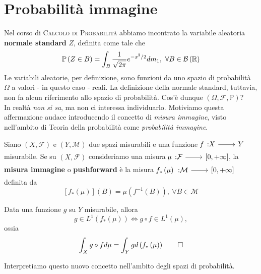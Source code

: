 \section{Probabilità immagine}\label{probimm}
Nel corso di \textsc{Calcolo di Probabilità} abbiamo incontrato la variabile aleatoria \textbf{normale standard} $Z$, definita come tale che
\begin{equation}
	\mathbb{P}\left(Z\in B\right)=\int_{B}\frac{1}{\sqrt{2\pi}}e^{-x^2/2}dm_1,\ \forall B\in\mathcal{B}\left(\mathbb{R}\right)
\end{equation}
Le variabili aleatorie, per definizione, sono funzioni da uno spazio di probabilità $\Omega$ a valori - in questo caso - reali. La definizione della normale standard, tuttavia, non fa alcun riferimento allo spazio di probabilità. Cos'è dunque  $\left(\Omega,\mathcal{F},\mathbb{P}\right)$?\\
In realtà \textit{non si sa}, ma non ci interessa individuarlo. Motiviamo questa affermazione audace introducendo il concetto di \textit{misura immagine}, visto nell'ambito di Teoria della probabilità come \textit{probabilità immagine}.
\begin{define}
	Siano $\left(X,\mathcal{F}\right)$ e $\left(Y,\mathcal{M}\right)$ due spazi misurabili e una funzione $\funz{f}{X}{Y}$ misurabile. Se su $\left(X,\mathcal{F}\right)$ consideriamo una misura $\funz{\mu}{\mathcal{F}}{\left[0,+\infty\right]}$, la \textbf{misura immagine} o \textbf{pushforward} è la misura $\funz{f_{\ast}\left(\mu\right)}{\mathcal{M}}{\left[0,+\infty\right]}$ definita da
	\begin{equation}
		\left[f_{\ast}\left(\mu\right)\right]\left(B\right)=\mu\left(f^{-1}\left(B\right)\right),\ \forall B\in \mathcal{M}
	\end{equation}
\end{define}
\begin{theoremaqed}
	Data una funzione $g$ su $Y$ misurabile, allora
	\begin{equation}
		g\in L^{1}\left(f_{\ast}\left(\mu\right)\right)\iff g\circ f\in L^{1}\left(\mu\right),
	\end{equation}
	ossia
	\begin{equation}
		\int_{X}g\circ fd\mu=\int_{Y}gd\left(f_{\ast}\left(\mu\right)\right)\qedhere
	\end{equation}
\end{theoremaqed}
Interpretiamo questo nuovo concetto nell'ambito degli spazi di probabilità.
